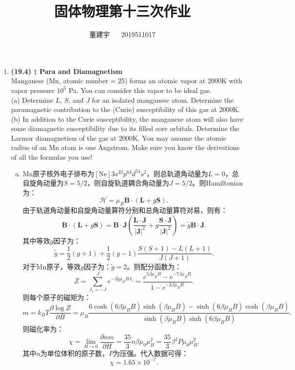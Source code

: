 \documentclass[reqno,a4paper,12pt]{amsart}
\title{固体物理第十三次作业}
\author{董建宇 ~~ 2019511017}
\begin{document}
\maketitle

\begin{enumerate}[1.]

\item \textbf{(19.4) $\ddagger$ Para and Diamagnetism} \\
Manganese (Mn, atomic number = 25) forms an atomic vapor at 2000K with vapor pressure $10^5$ Pa. You can consider this vapor to be ideal gas. \\
(a) Determine $L$, $S$, and $J$ for an isolated manganese atom. Determine the paramagnetic contribution to the (Curie) susceptibility of this gas at 2000K. \\
(b) In addition to the Curie susceptibility, the manganese atom will also have some diamagnetic susceptibility due to its filled core orbitals. Determine the Larmor diamagnetism of the gas at 2000K. You may assume the atomic radius of an Mn atom is one {\AA}ngstrom. Make sure you know the derivations of all the formulas you use!
\begin{tcolorbox}[breakable, colframe = black, colback = black!5!white]
\begin{enumerate}[(a)]
\item Mn原子核外电子排布为$[\text{Ne}]3s^23p^63d^54s^2$，则总轨道角动量为$L=0$，总自旋角动量为$S=5/2$，则自旋轨道耦合角动量为$J=5/2$。则Hamiltonian为：
\[
	\mathcal{H} = \mu_B\mathbf{B} \cdot (\mathbf{L}+g\mathbf{S}).
\]
由于轨道角动量和自旋角动量算符分别和总角动量算符对易，则有：
\[
	\mathbf{B} \cdot (\mathbf{L}+g\mathbf{S}) = \mathbf{B} \cdot \mathbf{J} \left( \frac{\mathbf{L} \cdot \mathbf{J}}{\vert \mathbf{J} \vert^2} + g\frac{\mathbf{S} \cdot \mathbf{J}}{\vert \mathbf{J} \vert^2} \right) = \tilde{g} \mathbf{B} \cdot \mathbf{J}.
\]
其中等效$g$因子为：
\[
	\tilde{g} = \frac{1}{2}(g+1) + \frac{1}{2}(g-1)\frac{S(S+1)-L(L+1)}{J(J+1)}.
\]
对于Mn原子，等效$g$因子为：$\tilde{g} = 2$。则配分函数为：
\[
	Z = \sum_{J_z=-J}^J e^{-\beta\tilde{g} \mu_BB J_z} = \frac{e^{5\beta\mu_BB}-e^{-7\beta\mu_BB}}{1-e^{-2\beta\mu_BB}}.
\]
则每个原子的磁矩为：
\[
	m = k_BT \frac{\partial \log Z}{\partial B} = \mu_B \frac{6\cosh(6\beta\mu_BB)\sinh(\beta\mu_BB)-\sinh(6\beta\mu_BB)\cosh(\beta\mu_BB)}{\sinh(\beta\mu_BB)\sinh(6\beta\mu_BB)}.
\]
则磁化率为：
\[
	\chi = \lim_{H\to 0} \frac{\partial nm}{\partial H} = \frac{35}{3}n\beta\mu_0\mu_B^2 = \frac{35}{3}\beta^2P\mu_0\mu_B^2.
\]
其中$n$为单位体积的原子数，$P$为压强。代入数据可得：
\[
	\chi = 1.65\times 10^{-7}.
\]


\end{enumerate}
\end{tcolorbox}
\end{enumerate}
\end{document}
